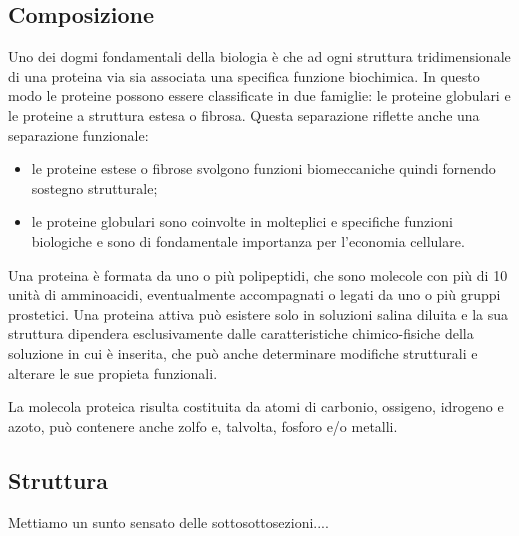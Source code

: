 \subsection{Composizione}\label{subsec:es_subsec}
Uno dei dogmi fondamentali della biologia è che ad ogni struttura tridimensionale di una proteina via sia associata una specifica funzione biochimica. In questo modo
le proteine possono essere classificate in due famiglie: le proteine globulari e le proteine a struttura estesa o fibrosa. Questa separazione riflette anche una
separazione funzionale:
\vspace{10pt}
\begin{itemize}
    \item le proteine estese o fibrose svolgono funzioni biomeccaniche quindi fornendo sostegno strutturale;
    \vspace{5pt}
    \item le proteine globulari sono coinvolte in molteplici e specifiche funzioni biologiche e sono di fondamentale importanza per l'economia cellulare.
\end{itemize}

Una proteina è formata da uno o più polipeptidi, che sono molecole con più di 10 unità di amminoacidi, eventualmente accompagnati o legati da uno o più gruppi
prostetici. Una proteina attiva può esistere solo in soluzioni salina diluita e la sua struttura dipendera esclusivamente dalle caratteristiche chimico-fisiche
della soluzione in cui è inserita, che può anche determinare modifiche strutturali e alterare le sue propieta funzionali. 

La molecola proteica risulta costituita da atomi di carbonio, ossigeno, idrogeno e azoto, può contenere anche zolfo  e, talvolta, fosforo e/o metalli.

\subsection{Struttura}\label{subsec:es_subsec}
Mettiamo un sunto sensato delle sottosottosezioni....
